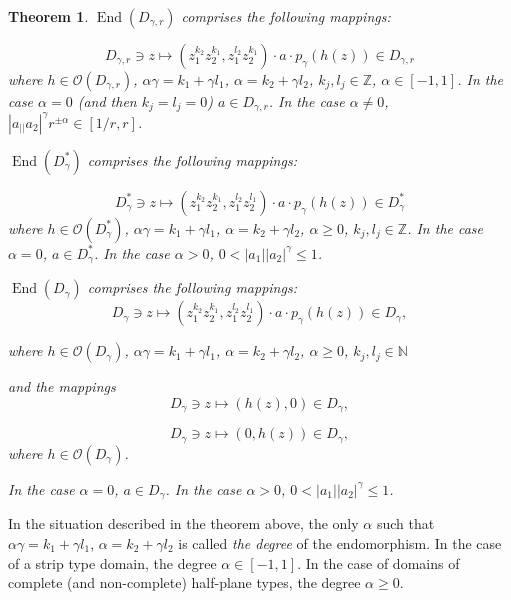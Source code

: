 \documentclass[a4paper,12pt]{amsart}
\DeclareMathOperator{\enmo}{End}
\newtheorem{theorem}{Theorem}[section]
\theoremstyle{definition}
\begin{document}
\begin{theorem}\label{theorem:endomorphisms}
$\enmo(D_{\gamma,r})$ comprises the following mappings:

\begin{equation}
    D_{\gamma,r}\owns z \mapsto (z_1^{k_2}z_2^{k_1},z_1^{l_2}z_2^{k_1})\cdot a\cdot p_{\gamma}(h(z))\in D_{\gamma,r}
\end{equation}
where $h\in\mathcal O(D_{\gamma,r})$, $\alpha\gamma=k_1+\gamma l_1$, $\alpha=k_2+\gamma l_2$, $k_j,l_j\in\mathbb Z$, $\alpha\in[-1,1]$. In the case $\alpha=0$ (and then $k_j=l_j=0$) $a\in D_{\gamma,r}$. In the case $\alpha\neq 0$, $|a_||a_2|^{\gamma} r^{\pm \alpha}\in[1/r,r]$.

$\enmo(D_{\gamma}^*)$ comprises the following mappings:

\begin{equation}
    D_{\gamma}^*\owns z \mapsto (z_1^{k_2}z_2^{k_1},z_1^{l_2}z_2^{l_1})\cdot a\cdot p_{\gamma}(h(z))\in D_{\gamma}^*
\end{equation}
where $h\in\mathcal O(D_{\gamma}^*)$, $\alpha\gamma=k_1+\gamma l_1$, $\alpha=k_2+\gamma l_2$, $\alpha\geq 0$, $k_j,l_j\in\mathbb Z$. In the case $\alpha=0$, $a\in D_{\gamma}^*$. In the case $\alpha>0$,  $0<|a_1||a_2|^{\gamma}\leq 1$.

$\enmo(D_{\gamma})$ comprises the following mappings:
\begin{equation}
    D_{\gamma}\owns z\mapsto (z_1^{k_2}z_2^{k_1},z_1^{l_2}z_2^{l_1})\cdot a\cdot p_{\gamma}(h(z))\in D_{\gamma},
\end{equation}

where $h\in\mathcal O(D_{\gamma})$, $\alpha\gamma=k_1+\gamma l_1$, $\alpha=k_2+\gamma l_2$, $\alpha\geq 0$, $k_j,l_j\in\mathbb N$

and the mappings
\begin{equation}
    D_{\gamma}\owns z\mapsto (h(z),0)\in D_{\gamma},
\end{equation}

\begin{equation}
    D_{\gamma}\owns z\mapsto (0,h(z))\in D_{\gamma},
\end{equation}
where $h\in\mathcal O(D_{\gamma})$.

In the case $\alpha=0$, $a\in D_{\gamma}$. In the case $\alpha>0$,  $0<|a_1||a_2|^{\gamma}\leq 1$.

\end{theorem}

In the situation described in the theorem above, the only $\alpha$ such that $\alpha\gamma=k_1+\gamma l_1$, $\alpha=k_2+\gamma l_2$ is called {\it the degree} of the endomorphism. In the case of a strip type domain, the degree $\alpha\in[-1,1]$. In the case of domains of complete (and non-complete) half-plane types, the degree $\alpha\geq 0$. 
\end{document}
